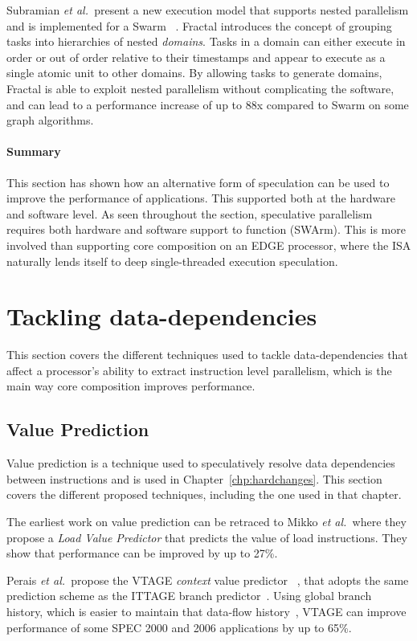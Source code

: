 Subramian {\it et al.~}present a new execution model that supports nested parallelism and is implemented for a Swarm~\cite{fractal2017} .
Fractal introduces the concept of grouping tasks into hierarchies of nested \textit{domains}.
Tasks in a domain can either execute in order or out of order relative to their timestamps and appear to execute as a single atomic unit to other domains.
By allowing tasks to generate domains, Fractal is able to exploit nested parallelism without complicating the software, and can lead to a performance increase of up to 88x compared to Swarm on some graph algorithms.
\vspace{-1em}
\paragraph*{Summary}
This section has shown how an alternative form of speculation can be used to improve the performance of applications.
This supported both at the hardware and software level.
As seen throughout the section, speculative parallelism requires both hardware and software support to function (SWArm).
This is more involved than supporting core composition on an EDGE processor, where the ISA naturally lends itself to deep single-threaded execution speculation.
\vspace{-1em}
\section{Tackling data-dependencies}
This section covers the different techniques used to tackle data-dependencies that affect a processor's ability to extract instruction level parallelism, which is the main way core composition improves performance.
\subsection{Value Prediction}
Value prediction is a technique used to speculatively resolve data dependencies between instructions and is used in Chapter~\ref{chp:hardchanges}.
This section covers the different proposed techniques, including the one used in that chapter. 

The earliest work on value prediction can be retraced to Mikko {\it et al.~}where they propose a \textit{Load Value Predictor} \cite{lipasti96valpred} that predicts the value of load instructions.
They show that performance can be improved by up to 27\%.

Perais {\it et al.~}propose the VTAGE \textit{context} value predictor ~\cite{peraisVTAGE2014}, that adopts the same prediction scheme as the ITTAGE branch predictor~\cite{SeznecITTAGE}.
Using global branch history, which is easier to maintain that data-flow history~\cite{peraisVTAGE2014}, VTAGE can improve performance of some SPEC 2000 and 2006 applications by up to 65\%.

